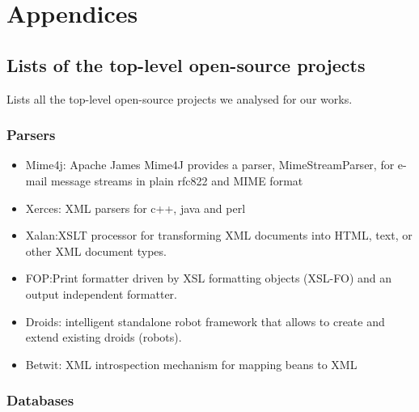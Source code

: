 \documentclass[12pt]{report}
\providecommand{\tightlist}{%
  \setlength{\itemsep}{0pt}\setlength{\parskip}{0pt}}
\begin{document}
\chapter{Appendices}\label{appendices}

\section{Lists of the top-level open-source
projects}\label{lists-of-the-top-level-open-source-projects}

Lists all the top-level open-source projects we analysed for our works.

\subsection{Parsers}\label{parsers}

\begin{itemize}
\tightlist
\item
  Mime4j: Apache James Mime4J provides a parser, MimeStreamParser, for
  e-mail message streams in plain rfc822 and MIME format
\item
  Xerces: XML parsers for c++, java and perl
\item
  Xalan:XSLT processor for transforming XML documents into HTML, text,
  or other XML document types.
\item
  FOP:Print formatter driven by XSL formatting objects (XSL-FO) and an
  output independent formatter.
\item
  Droids: intelligent standalone robot framework that allows to create
  and extend existing droids (robots).
\item
  Betwit: XML introspection mechanism for mapping beans to XML
\end{itemize}

\subsection{Databases}\label{databases}
\end{document}
